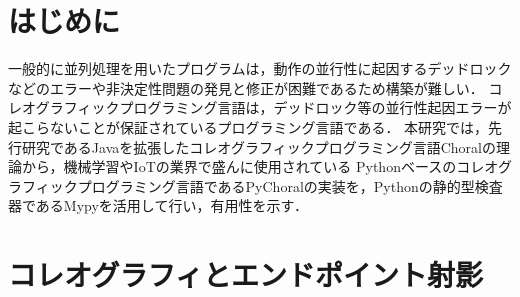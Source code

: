 \documentclass{resume}
\begin{document}
\maketitle

\section{はじめに}

一般的に並列処理を用いたプログラムは，動作の並行性に起因するデッドロックなどのエラーや非決定性問題の発見と修正が困難であるため構築が難しい．
コレオグラフィックプログラミング言語は，デッドロック等の並行性起因エラーが起こらないことが保証されているプログラミング言語である．
本研究では，先行研究であるJavaを拡張したコレオグラフィックプログラミング言語Choral\cite{choral}の理論から，機械学習やIoTの業界で盛んに使用されている
Pythonベースのコレオグラフィックプログラミング言語であるPyChoralの実装を，Pythonの静的型検査器であるMypyを活用して行い，有用性を示す．

\section{コレオグラフィとエンドポイント射影}
\end{document}
